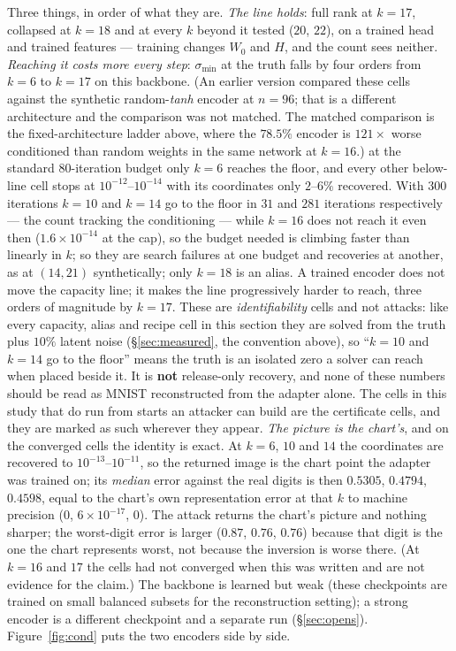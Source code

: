 Three things, in order of what they are. \emph{The line holds}: full rank at
$k=17$, collapsed at $k=18$ and at every $k$ beyond it tested ($20$, $22$),
on a trained head and trained features —
training changes $W_0$ and $H$, and the count sees neither. \emph{Reaching it costs more every step}: $\sigma_{\min}$ at the truth falls
by four orders from $k=6$ to $k=17$ on this backbone. (An earlier version
compared these cells against the synthetic random-\emph{tanh} encoder at
$n=96$; that is a different architecture and the comparison was not matched.
The matched comparison is the fixed-architecture ladder above, where the
$78.5\%$ encoder is $121\times$ worse conditioned than random weights in the
same network at $k=16$.) at the standard
$80$-iteration budget only $k=6$ reaches the floor, and every other
below-line cell stops at $10^{-12}$--$10^{-14}$ with its coordinates only
$2$--$6\%$ recovered. With $300$ iterations $k=10$ and $k=14$ go to the floor
in $31$ and $281$ iterations respectively — the count tracking the
conditioning — while $k=16$ does not reach it even then ($1.6\times10^{-14}$
at the cap), so the budget needed is climbing faster than linearly in $k$; so they are search failures at one budget and recoveries at
another, as at $(14,21)$ synthetically; only $k=18$ is an alias. A trained
encoder does not move the capacity line; it makes the line progressively
harder to reach, three orders of magnitude by $k=17$. These are
\emph{identifiability} cells and not attacks: like every capacity, alias and
recipe cell in this section they are solved from the truth plus $10\%$ latent
noise (\S\ref{sec:measured}, the convention above), so ``$k=10$ and $k=14$ go
to the floor'' means the truth is an isolated zero a solver can reach when
placed beside it. It is \textbf{not} release-only recovery, and none of these
numbers should be read as MNIST reconstructed from the adapter alone. The
cells in this study that do run from starts an attacker can build are the
certificate cells, and they are marked as such wherever they appear. \emph{The picture is the chart's}, and on the converged cells the identity is
exact. At $k=6$, $10$ and $14$ the coordinates are recovered to
$10^{-13}$--$10^{-11}$, so the returned image is the chart point the adapter
was trained on; its \emph{median} error against the real digits is then
$0.5305$, $0.4794$, $0.4598$, equal to the chart's own representation error
at that $k$ to machine precision ($0$, $6\times10^{-17}$, $0$). The attack
returns the chart's picture and nothing sharper; the worst-digit error is
larger ($0.87$, $0.76$, $0.76$) because that digit is the one the chart
represents worst, not because the inversion is worse there. (At $k=16$ and
$17$ the cells had not converged when this was written and are not evidence
for the claim.) The backbone is learned but weak (these checkpoints are trained on
small balanced subsets for the reconstruction setting); a strong encoder is
a different checkpoint and a separate run (\S\ref{sec:opens}).
Figure~\ref{fig:cond} puts the two encoders side by side.

